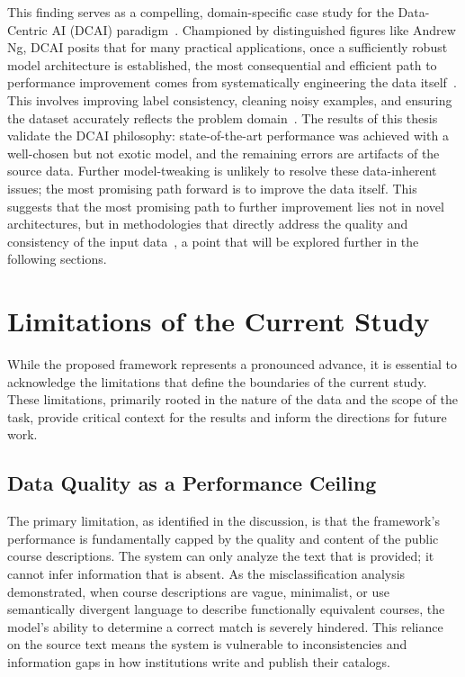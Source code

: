 This finding serves as a compelling, domain-specific case study for the Data-Centric AI (DCAI) paradigm~\cite{zha2023datacentricartificialintelligencesurvey,wang2025datacentricaicomprehensivesurvey}. Championed by distinguished figures like Andrew Ng, DCAI posits that for many practical applications, once a sufficiently robust model architecture is established, the most consequential and efficient path to performance improvement comes from systematically engineering the data itself~\cite{ngdatacentric_2021,Strickland_2023}. This involves improving label consistency, cleaning noisy examples, and ensuring the dataset accurately reflects the problem domain~\cite{zha2023datacentricartificialintelligencesurvey,ying2025surveydatacentricaitabular}. The results of this thesis validate the DCAI philosophy: state-of-the-art performance was achieved with a well-chosen but not exotic model, and the remaining errors are artifacts of the source data. Further model-tweaking is unlikely to resolve these data-inherent issues; the most promising path forward is to improve the data itself. This suggests that the most promising path to further improvement lies not in novel architectures, but in methodologies that directly address the quality and consistency of the input data~\cite{gauthier2022}, a point that will be explored further in the following sections.

\section{Limitations of the Current Study}\label{ch:5.2}
While the proposed framework represents a pronounced advance, it is essential to acknowledge the limitations that define the boundaries of the current study. These limitations, primarily rooted in the nature of the data and the scope of the task, provide critical context for the results and inform the directions for future work.

\subsection{Data Quality as a Performance Ceiling}\label{ch:5.2.1}
The primary limitation, as identified in the discussion, is that the framework's performance is fundamentally capped by the quality and content of the public course descriptions. The system can only analyze the text that is provided; it cannot infer information that is absent. As the misclassification analysis demonstrated, when course descriptions are vague, minimalist, or use semantically divergent language to describe functionally equivalent courses, the model's ability to determine a correct match is severely hindered. This reliance on the source text means the system is vulnerable to inconsistencies and information gaps in how institutions write and publish their catalogs.

